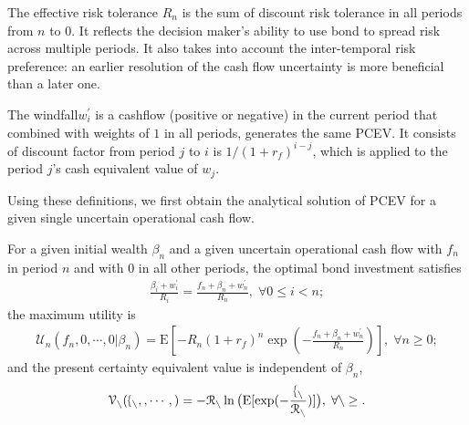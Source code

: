 \documentclass[mnsc,nonblindrev,copyedit]{informs2_wz} %
\newcommand{\E}{\mathrm{E}}
\newcommand{\V}{\cal{V}}
\begin{document}
The effective risk tolerance $R_n$ is the sum of discount risk tolerance in all periods from $n$ to $0$. It reflects the decision maker's ability to use bond to spread risk across multiple periods.  It also takes into account the inter-temporal risk preference: an earlier resolution of the cash flow uncertainty is more beneficial than a later one. 

The windfall$w^\prime_i$ is a cashflow (positive or negative) in the current period that combined with weights of $1$ in all periods, generates the same PCEV.  
It consists of discount factor from period $j$ to $i$ is $1/(1+r_f)^{i-j}$, which is applied to the period $j$'s cash equivalent value of $w_j$. %

Using these definitions, we first obtain the analytical solution of PCEV for a given single uncertain operational cash flow.

\begin{lemma} \label{lem:pcev-Xn-gen}
For a given initial wealth $\beta_n$ and a given uncertain operational cash flow with $f_n$ in period $n$ and with $0$ in all other periods, the optimal bond investment satisfies
\begin{eqnarray}\label{eqn:beta-Xn}
\frac{\beta_i + w_i^\prime}{R_i} = \frac{f_n+\beta_n + w_n^\prime}{R_n}, \; \forall 0\leq i< n;
\end{eqnarray}
the maximum utility is
\begin{eqnarray} \label{eqn:Un-Xn}
\mathcal{U}_n(f_n, 0, \cdots, 0|\beta_{n}) = \E[-R_n (1+r_f)^n \exp (-  \frac{f_n + \beta_n +w_n^\prime}{R_n})], \; \forall n \geq 0;
\end{eqnarray}
and the present certainty equivalent value is independent of $\beta_n$,
\begin{eqnarray}
\V_n(f_n,0,\cdots,0)=-R_n \ln\big{(} \E[\exp(-\frac{f_n}{R_n})]\big{)}, \; \forall n \geq 0. \label{eqn:pcev-Xn-gen}
\end{eqnarray}
\end{lemma}
\end{document}
